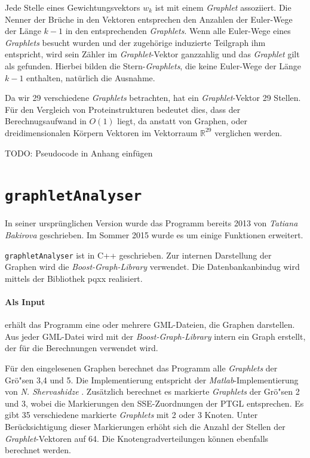 \documentclass{report}
\begin{document}
Jede Stelle eines Gewichtungsvektors $w_k$ ist mit einem \textit{Graphlet} assoziiert. Die Nenner der Br\"uche in den Vektoren entsprechen den Anzahlen der Euler-Wege der L\"ange $k-1$ in den entsprechenden \textit{Graphlets}. Wenn alle Euler-Wege eines \textit{Graphlets} besucht wurden und der zugeh\"orige induzierte Teilgraph ihm entspricht, wird sein Z\"ahler im \textit{Graphlet}-Vektor ganzzahlig und das \textit{Graphlet} gilt als gefunden.
Hierbei bilden  die Stern-\textit{Graphlets}, die keine Euler-Wege der L\"ange $k-1$ enthalten, nat\"urlich die Ausnahme.
 
Da wir 29 verschiedene \textit{Graphlets} betrachten, hat ein \textit{Graphlet}-Vektor 29 Stellen. F\"ur den Vergleich von Proteinstrukturen bedeutet dies, dass der Berechnugsaufwand in $O(1)$ liegt, da anstatt von Graphen, oder dreidimensionalen K\"orpern Vektoren im Vektorraum $\mathbb{R}^{29}$ verglichen werden.

TODO: Pseudocode in Anhang einf\"ugen


\section{\texttt{graphletAnalyser}}

In seiner urspr\"unglichen Version wurde das Programm bereits 2013 von \textit{Tatiana Bakirova} geschrieben. Im Sommer 2015 wurde es um einige Funktionen erweitert.

\texttt{graphletAnalyser} ist in C++ geschrieben. Zur internen Darstellung der Graphen wird die \textit{Boost-Graph-Library} verwendet. Die Datenbankanbindug wird mittels der Bibliothek pqxx realisiert.

\paragraph{Als Input} erh\"alt das Programm eine oder mehrere GML-Dateien, die Graphen darstellen. Aus jeder GML-Datei wird mit der \textit{Boost-Graph-Library} intern ein Graph erstellt, der f\"ur die Berechnungen verwendet wird.

F\"ur den eingelesenen Graphen berechnet das Programm alle \textit{Graphlets} der Gr\"o"sen 3,4 und 5. Die Implementierung entspricht der \textit{Matlab}-Implementierung von \textit{N. Shervashidze} \cite{sherv_graphlets}. Zus\"atzlich berechnet es markierte \textit{Graphlets} der Gr\"o"sen 2 und 3, wobei die Markierungen den SSE-Zuordnungen der PTGL entsprechen. Es gibt 35 verschiedene markierte \textit{Graphlets} mit 2 oder 3 Knoten. Unter Ber\"ucksichtigung dieser Markierungen erh\"oht sich die Anzahl der Stellen der \textit{Graphlet}-Vektoren auf 64.
Die Knotengradverteilungen k\"onnen ebenfalls berechnet werden.
\end{document}
